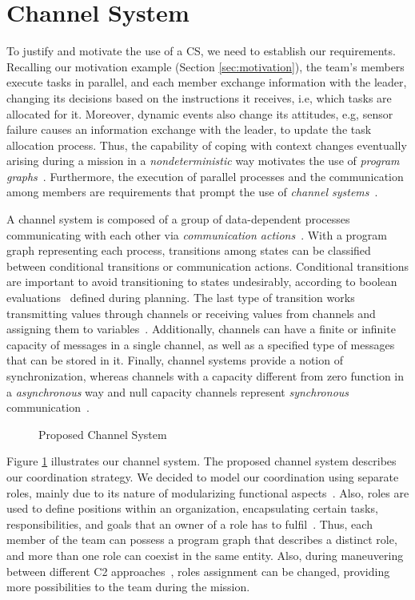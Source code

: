 \section{Channel System}
\label{sec:channelSystem}

To justify and motivate the use of a CS, we need to establish our requirements. Recalling our motivation example (Section \ref{sec:motivation}), the team's members execute tasks in parallel, and each member exchange information with the leader, changing its decisions based on the instructions it receives, i.e, which tasks are allocated for it. Moreover, dynamic events also change its attitudes, e.g, sensor failure causes an information exchange with the leader, to update the task allocation process. Thus, the capability of coping with context changes eventually arising during a mission in a \textit{nondeterministic} way motivates the use of \textit{program graphs}~\cite{modelcheckingBaier}. Furthermore, the execution of parallel processes and the communication among members are requirements that prompt the use of \textit{channel systems}~\cite{modelcheckingBaier}.

A channel system is composed of a group of data-dependent processes communicating with each other via \textit{communication actions}~\cite{modelcheckingBaier}. With a program graph representing each process, transitions among states can be classified between conditional transitions or communication actions. Conditional transitions are important to avoid transitioning to states undesirably, according to boolean evaluations~\cite{modelcheckingBaier} defined during planning. The last type of transition works transmitting values through channels or receiving values from channels and assigning them to variables~\cite{modelcheckingBaier}. Additionally, channels can have a finite or infinite capacity of messages in a single channel, as well as a specified type of messages that can be stored in it. Finally, channel systems provide a notion of synchronization, whereas channels with a capacity different from zero function in a \textit{asynchronous} way and null capacity channels represent \textit{synchronous} communication~\cite{modelcheckingBaier}.

\begin{figure}[!ht]
    \centering
    \scalebox{.75}{}
    \caption{Proposed Channel System}
    \label{fig:CS}
\end{figure}

Figure \ref{fig:CS} illustrates our channel system. The proposed channel system describes our coordination strategy. We decided to model our coordination using separate roles, mainly due to its nature of modularizing functional aspects~\cite{roleOrientedModeling}. Also, roles are used to define positions within an organization, encapsulating certain tasks, responsibilities, and goals that an owner of a role has to fulfil~\cite{roleOrientedModeling}. Thus, each member of the team can possess a program graph that describes a distinct role, and more than one role can coexist in the same entity. Also, during maneuvering between different C2 approaches~\cite{france2014}, roles assignment can be changed, providing more possibilities to the team during the mission.

